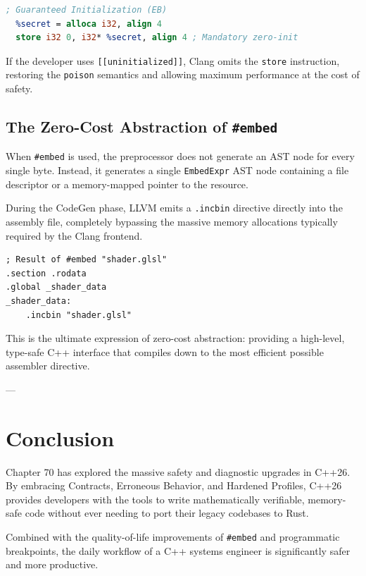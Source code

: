 {{{{{{{{\begin{lstlisting}[language=llvm]
; Guaranteed Initialization (EB)
  %secret = alloca i32, align 4
  store i32 0, i32* %secret, align 4 ; Mandatory zero-init
\end{lstlisting}

If the developer uses \texttt{[[uninitialized]]}, Clang omits the \texttt{store} instruction, restoring the \texttt{poison} semantics and allowing maximum performance at the cost of safety.

\subsection{The Zero-Cost Abstraction of \texttt{#embed}}

When \texttt{#embed} is used, the preprocessor does not generate an AST node for every single byte. Instead, it generates a single \texttt{EmbedExpr} AST node containing a file descriptor or a memory-mapped pointer to the resource.

During the CodeGen phase, LLVM emits a \texttt{.incbin} directive directly into the assembly file, completely bypassing the massive memory allocations typically required by the Clang frontend.

\begin{lstlisting}[language={[x86masm]Assembler}]
; Result of #embed "shader.glsl"
.section .rodata
.global _shader_data
_shader_data:
    .incbin "shader.glsl"
\end{lstlisting}

This is the ultimate expression of zero-cost abstraction: providing a high-level, type-safe C++ interface that compiles down to the most efficient possible assembler directive.

---

\section{Conclusion}

Chapter 70 has explored the massive safety and diagnostic upgrades in C++26. By embracing Contracts, Erroneous Behavior, and Hardened Profiles, C++26 provides developers with the tools to write mathematically verifiable, memory-safe code without ever needing to port their legacy codebases to Rust.

Combined with the quality-of-life improvements of \texttt{#embed} and programmatic breakpoints, the daily workflow of a C++ systems engineer is significantly safer and more productive.

}}}}}}}}
